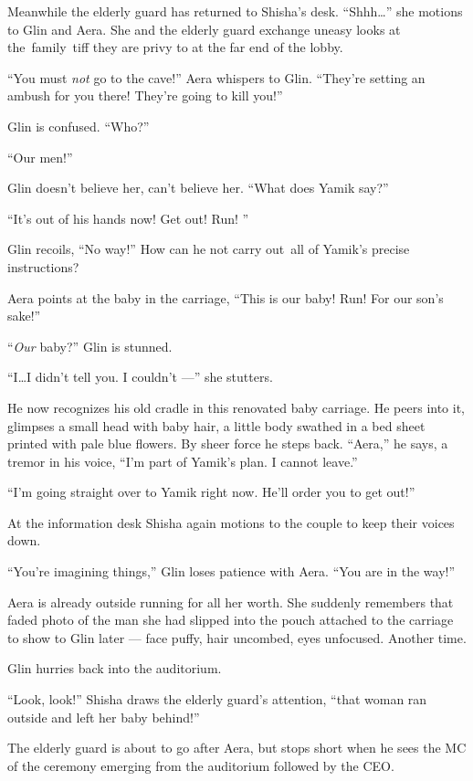 \documentclass[twoside,11pt,openany]{book}
\begin{document}
Meanwhile the elderly guard has returned to Shisha's desk. ``Shhh{\ldots}'' she motions to Glin
and Aera. She and the elderly guard exchange{ u}neasy looks at the~family~tiff
they are privy to at the far end of the lobby.\textbf{ }

``You must \textit{not} go to the cave!'' Aera whispers to Glin.
``They're setting an ambush for you there! They're going to kill you!''

Glin is confused. ``Who?''

``Our men!''

Glin doesn't believe her, can't believe her.  ``What does Yamik say?''

``It's out of his hands now! Get out! Run! ''

Glin recoils, ``No way!'' How can he not carry out~all of Yamik's precise instructions?

Aera points at the baby in the carriage, ``This is our baby! Run! For our son's sake!''

``\textit{Our }baby?'' Glin is stunned.

``I{\ldots}I didn't tell you. I couldn't ---'' she stutters.

He now recognizes his old cradle in this renovated baby carriage.
He peers into it, glimpses a small head with baby hair, a little body
swathed in a bed sheet printed with pale blue flowers. By sheer force he steps back.
``Aera,'' he says, a tremor in his voice, ``I'm part of Yamik's plan. I cannot
leave.''

``I'm going straight over to Yamik right now. He'll order you to get out!''

At the information desk Shisha again motions to the couple to keep their voices down.

``You're imagining things,'' Glin loses patience with Aera. ``You are in the
way!''

Aera is already outside running for all her worth. She suddenly remembers that faded photo of the man she had slipped
into the pouch attached to the carriage to show to Glin later --- face puffy, hair uncombed, eyes unfocused. Another
time.

Glin hurries back into the auditorium.

``Look, look!'' Shisha draws the elderly guard's attention, ``that woman ran
outside and left her baby behind!''

The elderly guard is about to go after Aera, but stops short when he sees the MC of the ceremony emerging from the
auditorium followed by the CEO.
\end{document}
